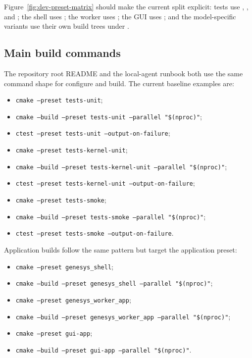 Figure~\ref{fig:dev-preset-matrix} should make the current split explicit:
tests use , , and
; the shell uses ; the
worker uses ; the GUI uses
; and the model-specific variants use their own build
trees under .

\subsection{Main build commands}
\label{subsec:dev-main-build-commands}

The repository root README and the local-agent runbook both use the same
command shape for configure and build. The current baseline examples are:
\begin{itemize}
\item \texttt{cmake --preset tests-unit};
\item \texttt{cmake --build --preset tests-unit --parallel "\$(nproc)"};
\item \texttt{ctest --preset tests-unit --output-on-failure};
\item \texttt{cmake --preset tests-kernel-unit};
\item \texttt{cmake --build --preset tests-kernel-unit --parallel "\$(nproc)"};
\item \texttt{ctest --preset tests-kernel-unit --output-on-failure};
\item \texttt{cmake --preset tests-smoke};
\item \texttt{cmake --build --preset tests-smoke --parallel "\$(nproc)"};
\item \texttt{ctest --preset tests-smoke --output-on-failure}.
\end{itemize}

Application builds follow the same pattern but target the application preset:
\begin{itemize}
\item \texttt{cmake --preset genesys\_shell};
\item \texttt{cmake --build --preset genesys\_shell --parallel "\$(nproc)"};
\item \texttt{cmake --preset genesys\_worker\_app};
\item \texttt{cmake --build --preset genesys\_worker\_app --parallel "\$(nproc)"};
\item \texttt{cmake --preset gui-app};
\item \texttt{cmake --build --preset gui-app --parallel "\$(nproc)"}.
\end{itemize}

